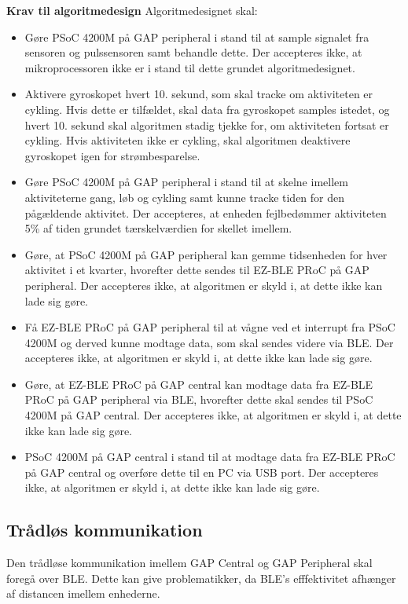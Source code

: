 \textbf{Krav til algoritmedesign} \newline 
Algoritmedesignet skal:
\begin{itemize}
	\item Gøre PSoC 4200M på GAP peripheral i stand til at sample signalet fra sensoren og pulssensoren samt behandle dette. Der accepteres ikke, at mikroprocessoren ikke er i stand til dette grundet algoritmedesignet.
	\item Aktivere gyroskopet hvert 10. sekund, som skal tracke om aktiviteten er cykling. Hvis dette er tilfældet, skal data fra gyroskopet samples istedet, og hvert 10. sekund skal algoritmen stadig tjekke for, om aktiviteten fortsat er cykling. Hvis aktiviteten ikke er cykling, skal algoritmen deaktivere gyroskopet igen for strømbesparelse.
	\item Gøre PSoC 4200M på GAP peripheral i stand til at skelne imellem aktiviteterne gang, løb og cykling samt kunne tracke tiden for den pågældende aktivitet. Der accepteres, at enheden fejlbedømmer aktiviteten 5\% af tiden grundet tærskelværdien for skellet imellem.
	\item Gøre, at PSoC 4200M på GAP peripheral kan gemme tidsenheden for hver aktivitet i et kvarter, hvorefter dette sendes til EZ-BLE PRoC på GAP peripheral. Der accepteres ikke, at algoritmen er skyld i, at dette ikke kan lade sig gøre.
	\item Få EZ-BLE PRoC på GAP peripheral til at vågne ved et interrupt fra PSoC 4200M og derved kunne modtage data, som skal sendes videre via BLE. Der accepteres ikke, at algoritmen er skyld i, at dette ikke kan lade sig gøre.
	\item Gøre, at EZ-BLE PRoC på GAP central kan modtage data fra EZ-BLE PRoC på GAP peripheral via BLE, hvorefter dette skal sendes til PSoC 4200M på GAP central. Der accepteres ikke, at algoritmen er skyld i, at dette ikke kan lade sig gøre.
	\item PSoC 4200M på GAP central i stand til at modtage data fra EZ-BLE PRoC på GAP central og overføre dette til en PC via USB port. Der accepteres ikke, at algoritmen er skyld i, at dette ikke kan lade sig gøre.
\end{itemize}

\subsection{Trådløs kommunikation}
Den trådløse kommunikation imellem GAP Central og GAP Peripheral skal foregå over BLE. Dette kan give problematikker, da BLE's efffektivitet afhænger af distancen imellem enhederne. 

